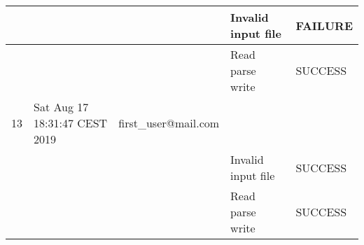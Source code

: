 \begin{table}[]
{\begin{tabular}{|l|l|l|l|l|}
    &       &                                            & Invalid input file                          & FAILURE                                \\ \hline
    &       &                                            & Read parse write                            & SUCCESS                                \\ \hline
    13 &    Sat Aug 17 18:31:47 CEST 2019        & first\_user@mail.com            &                                             &                                        \\ \hline
    &       &                                            & Invalid input file                          & SUCCESS                                \\ \hline
    &       &                                            & Read parse write                            & SUCCESS                                \\ \hline
\end{tabular}
\label{tab:read_parse_write}

}
\end{table}